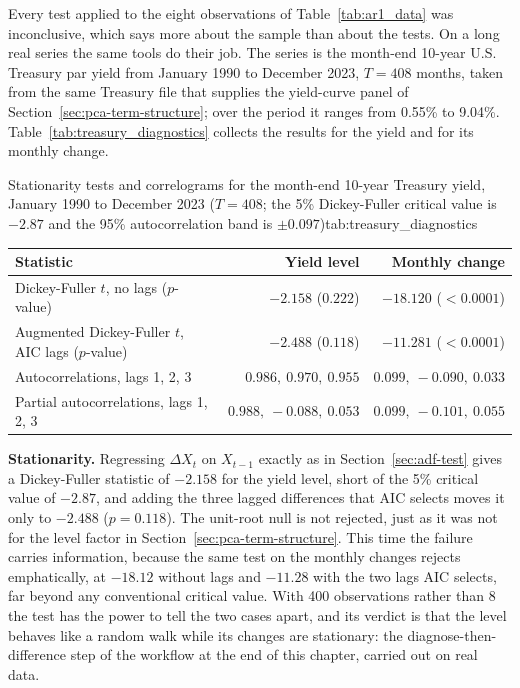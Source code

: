 \documentclass[../ai_in_finance]{subfiles}
\begin{document}
Every test applied to the eight observations of Table~\ref{tab:ar1_data} was inconclusive, which says more about the sample than about the tests. On a long real series the same tools do their job. The series is the month-end 10-year U.S. Treasury par yield from January 1990 to December 2023, $T = 408$ months, taken from the same Treasury file that supplies the yield-curve panel of Section~\ref{sec:pca-term-structure}; over the period it ranges from 0.55\% to 9.04\%. Table~\ref{tab:treasury_diagnostics} collects the results for the yield and for its monthly change.

\begin{booktable}{Stationarity tests and correlograms for the month-end 10-year Treasury yield, January 1990 to December 2023 ($T = 408$; the 5\% Dickey-Fuller critical value is $-2.87$ and the 95\% autocorrelation band is $\pm 0.097$)}{tab:treasury_diagnostics}
\begin{tabular}{lrr}
\toprule
Statistic & Yield level & Monthly change \\
\midrule
Dickey-Fuller $t$, no lags ($p$-value) & $-2.158$ ($0.222$) & $-18.120$ ($<0.0001$) \\
Augmented Dickey-Fuller $t$, AIC lags ($p$-value) & $-2.488$ ($0.118$) & $-11.281$ ($<0.0001$) \\
Autocorrelations, lags 1, 2, 3 & $0.986,\ 0.970,\ 0.955$ & $0.099,\ -0.090,\ 0.033$ \\
Partial autocorrelations, lags 1, 2, 3 & $0.988,\ -0.088,\ 0.053$ & $0.099,\ -0.101,\ 0.055$ \\
\bottomrule
\end{tabular}
\end{booktable}

\textbf{Stationarity.} Regressing $\Delta X_t$ on $X_{t-1}$ exactly as in Section~\ref{sec:adf-test} gives a Dickey-Fuller statistic of $-2.158$ for the yield level, short of the 5\% critical value of $-2.87$, and adding the three lagged differences that AIC selects moves it only to $-2.488$ ($p = 0.118$). The unit-root null is not rejected, just as it was not for the level factor in Section~\ref{sec:pca-term-structure}. This time the failure carries information, because the same test on the monthly changes rejects emphatically, at $-18.12$ without lags and $-11.28$ with the two lags AIC selects, far beyond any conventional critical value. With 400 observations rather than 8 the test has the power to tell the two cases apart, and its verdict is that the level behaves like a random walk while its changes are stationary: the diagnose-then-difference step of the workflow at the end of this chapter, carried out on real data.
\end{document}
